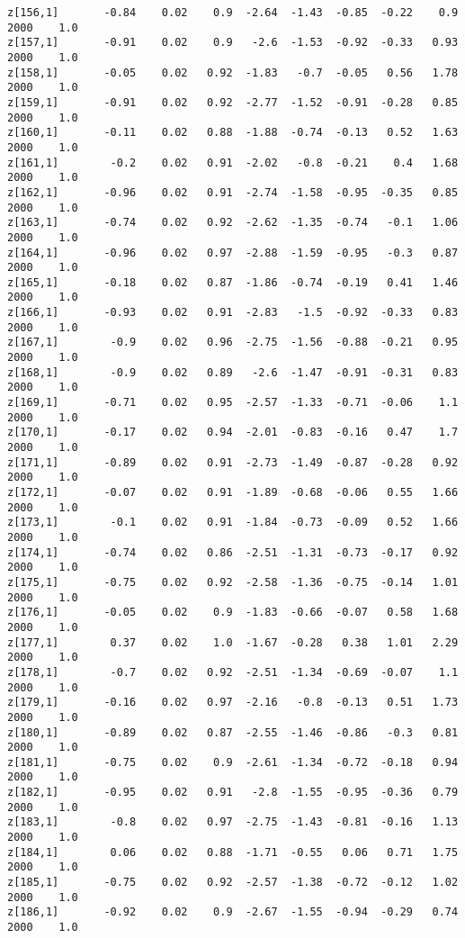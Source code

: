 \documentclass[11pt]{article}
\begin{document}
\begin{Verbatim}[commandchars=\\\{\}]
z[156,1]       -0.84    0.02    0.9  -2.64  -1.43  -0.85  -0.22    0.9   2000    1.0
z[157,1]       -0.91    0.02    0.9   -2.6  -1.53  -0.92  -0.33   0.93   2000    1.0
z[158,1]       -0.05    0.02   0.92  -1.83   -0.7  -0.05   0.56   1.78   2000    1.0
z[159,1]       -0.91    0.02   0.92  -2.77  -1.52  -0.91  -0.28   0.85   2000    1.0
z[160,1]       -0.11    0.02   0.88  -1.88  -0.74  -0.13   0.52   1.63   2000    1.0
z[161,1]        -0.2    0.02   0.91  -2.02   -0.8  -0.21    0.4   1.68   2000    1.0
z[162,1]       -0.96    0.02   0.91  -2.74  -1.58  -0.95  -0.35   0.85   2000    1.0
z[163,1]       -0.74    0.02   0.92  -2.62  -1.35  -0.74   -0.1   1.06   2000    1.0
z[164,1]       -0.96    0.02   0.97  -2.88  -1.59  -0.95   -0.3   0.87   2000    1.0
z[165,1]       -0.18    0.02   0.87  -1.86  -0.74  -0.19   0.41   1.46   2000    1.0
z[166,1]       -0.93    0.02   0.91  -2.83   -1.5  -0.92  -0.33   0.83   2000    1.0
z[167,1]        -0.9    0.02   0.96  -2.75  -1.56  -0.88  -0.21   0.95   2000    1.0
z[168,1]        -0.9    0.02   0.89   -2.6  -1.47  -0.91  -0.31   0.83   2000    1.0
z[169,1]       -0.71    0.02   0.95  -2.57  -1.33  -0.71  -0.06    1.1   2000    1.0
z[170,1]       -0.17    0.02   0.94  -2.01  -0.83  -0.16   0.47    1.7   2000    1.0
z[171,1]       -0.89    0.02   0.91  -2.73  -1.49  -0.87  -0.28   0.92   2000    1.0
z[172,1]       -0.07    0.02   0.91  -1.89  -0.68  -0.06   0.55   1.66   2000    1.0
z[173,1]        -0.1    0.02   0.91  -1.84  -0.73  -0.09   0.52   1.66   2000    1.0
z[174,1]       -0.74    0.02   0.86  -2.51  -1.31  -0.73  -0.17   0.92   2000    1.0
z[175,1]       -0.75    0.02   0.92  -2.58  -1.36  -0.75  -0.14   1.01   2000    1.0
z[176,1]       -0.05    0.02    0.9  -1.83  -0.66  -0.07   0.58   1.68   2000    1.0
z[177,1]        0.37    0.02    1.0  -1.67  -0.28   0.38   1.01   2.29   2000    1.0
z[178,1]        -0.7    0.02   0.92  -2.51  -1.34  -0.69  -0.07    1.1   2000    1.0
z[179,1]       -0.16    0.02   0.97  -2.16   -0.8  -0.13   0.51   1.73   2000    1.0
z[180,1]       -0.89    0.02   0.87  -2.55  -1.46  -0.86   -0.3   0.81   2000    1.0
z[181,1]       -0.75    0.02    0.9  -2.61  -1.34  -0.72  -0.18   0.94   2000    1.0
z[182,1]       -0.95    0.02   0.91   -2.8  -1.55  -0.95  -0.36   0.79   2000    1.0
z[183,1]        -0.8    0.02   0.97  -2.75  -1.43  -0.81  -0.16   1.13   2000    1.0
z[184,1]        0.06    0.02   0.88  -1.71  -0.55   0.06   0.71   1.75   2000    1.0
z[185,1]       -0.75    0.02   0.92  -2.57  -1.38  -0.72  -0.12   1.02   2000    1.0
z[186,1]       -0.92    0.02    0.9  -2.67  -1.55  -0.94  -0.29   0.74   2000    1.0

\end{Verbatim}
\end{document}
